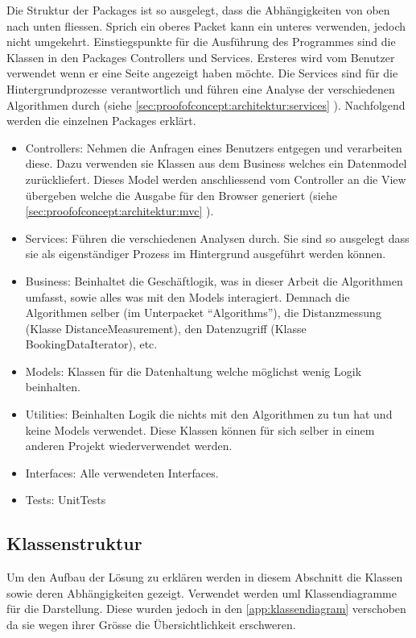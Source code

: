 Die Struktur der Packages ist so ausgelegt, dass die Abhängigkeiten von oben nach unten fliessen. Sprich ein oberes Packet kann ein unteres verwenden, jedoch nicht umgekehrt. Einstiegspunkte für die Ausführung des Programmes sind die Klassen in den Packages Controllers und Services. Ersteres wird vom Benutzer verwendet wenn er eine Seite angezeigt haben möchte. Die Services sind für die Hintergrundprozesse verantwortlich und führen eine Analyse der verschiedenen Algorithmen durch (siehe \cref{sec:proofofconcept:architektur:services} ). Nachfolgend werden die einzelnen Packages erklärt.

\begin{itemize}
	\item Controllers: Nehmen die Anfragen eines Benutzers entgegen und verarbeiten diese. Dazu verwenden sie Klassen aus dem Business welches ein Datenmodel zurückliefert. Dieses Model werden anschliessend vom Controller an die View übergeben welche die Ausgabe für den Browser generiert (siehe \cref{sec:proofofconcept:architektur:mvc} ).
	\item Services: Führen die verschiedenen Analysen durch. Sie sind so ausgelegt dass sie als eigenständiger Prozess im Hintergrund ausgeführt werden können.
	\item Business: Beinhaltet die Geschäftlogik, was in dieser Arbeit die Algorithmen umfasst, sowie alles was mit den Models interagiert. Demnach die Algorithmen selber (im Unterpacket "`Algorithms"'), die Distanzmessung (Klasse DistanceMeasurement), den Datenzugriff (Klasse BookingDataIterator), etc.
	\item Models: Klassen für die Datenhaltung welche möglichst wenig Logik beinhalten.
	\item Utilities: Beinhalten Logik die nichts mit den Algorithmen zu tun hat und keine Models verwendet. Diese Klassen können für sich selber in einem anderen Projekt wiederverwendet werden.
	\item Interfaces: Alle verwendeten Interfaces.
	\item Tests: UnitTests
\end{itemize}

\subsection{Klassenstruktur}
\label{sec:proofofconcept:klassenstruktur}
Um den Aufbau der Lösung zu erklären werden in diesem Abschnitt die Klassen sowie deren Abhängigkeiten gezeigt. Verwendet werden \gls{uml} Klassendiagramme für die Darstellung. Diese wurden jedoch in den \cref{app:klassendiagram} verschoben da sie wegen ihrer Grösse die Übersichtlichkeit erschweren.

